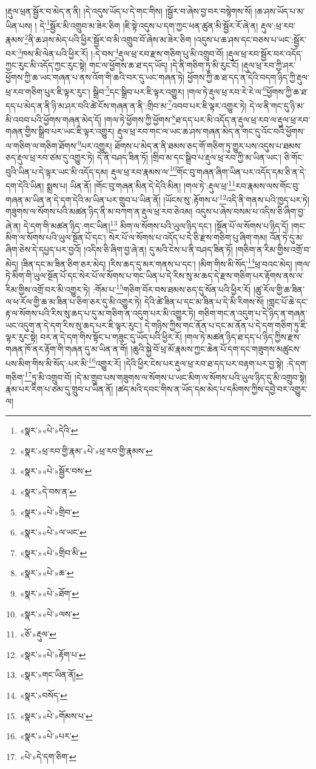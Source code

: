 །རྡུལ་ཕྲན་སྦྱོར་བ་མེད་ན་ནི། །དེ་འདུས་ཡོད་པ་དེ་གང་གིས། །སྦྱོར་བ་ཞེས་བྱ་བར་བསྙེགས་སོ། །ཆ་ཤས་ཡོད་པ་མ་ཡིན་པས། །
དེ་\footnote{«སྣར་»«པེ་»དེའི་}སྦྱོར་མི་འགྲུབ་མ་ཟེར་ཅིག །ཇི་སྟེ་འདུས་པ་དག་ཀྱང་ཕན་ཚུན་མི་སྦྱོར་རོ་ཞེ་ན། རྡུལ་:ཕྲ་རབ་རྣམས་\footnote{«སྣར་»ཕྲ་རབ་གྱི་རྣམ་«པེ་»ཕྲ་རབ་གྱི་རྣམས་}ནི་ཆ་ཤས་མེད་པའི་ཕྱིར་སྦྱོར་བ་མི་འགྲུབ་བོ་ཞེས་མ་ཟེར་ཅིག །འདུས་པ་ཆ་ཤས་དང་བཅས་པ་ཡང་:སྦྱོར་བར་\footnote{«སྣར་»«པེ་»སྦྱོར་བས་}ཁས་མི་ལེན་པའི་ཕྱིར་རོ། །:དེ་བས་\footnote{«སྣར་»དེ་བས་ན་}རྡུལ་ཕྲ་རབ་རྫས་གཅིག་པུ་མི་འགྲུབ་བོ། །རྡུལ་ཕྲ་རབ་སྦྱོར་བར་འདོད་ཀྱང་རུང་མི་འདོད་ཀྱང་རུང་སྟེ། གང་ལ་ཕྱོགས་ཆ་ཐ་དད་ཡོད། །དེ་ནི་གཅིག་ཏུ་མི་རུང་ངོ། །རྡུལ་ཕྲ་རབ་ཀྱི་ཤར་ཕྱོགས་ཀྱི་ཆ་ཡང་གཞན་པ་ནས་འོག་གི་ཆའི་བར་དུ་ཡང་གཞན་ཏེ། ཕྱོགས་ཀྱི་ཆ་ཐ་དད་ན་དེའི་བདག་ཉིད་ཀྱི་རྡུལ་ཕྲ་རབ་གཅིག་པུར་ཇི་ལྟར་རུང་། སྒྲིབ་\footnote{«སྣར་»«པེ་»གྲིབ་}དང་སྒྲིབ་པར་ཇི་ལྟར་འགྱུར། །གལ་ཏེ་རྡུལ་ཕྲ་རབ་རེ་རེ་ལ་\footnote{«སྣར་»«པེ་»ལ་ཡང་}ཕྱོགས་ཀྱི་ཆ་ཐ་དད་པ་མེད་ན་ནི་ཉི་མ་ཤར་བའི་ཚེ་ངོས་གཞན་ན་ནི་:གྲིབ་མ་\footnote{«སྣར་»«པེ་»གྲིབ་མི་}འབབ་པར་ཇི་ལྟར་འགྱུར་ཏེ། དེ་ལ་ནི་གང་དུ་ཉི་མ་མི་འབབ་པའི་ཕྱོགས་གཞན་མེད་དོ། །གལ་ཏེ་ཕྱོགས་ཀྱི་ཕྱོགས་\footnote{«སྣར་»«པེ་»ཆ་}ཐ་དད་པར་མི་འདོད་ན་རྡུལ་ཕྲ་རབ་ལ་རྡུལ་ཕྲ་རབ་གཞན་གྱིས་སྒྲིབ་པར་ཡང་ཇི་ལྟར་འགྱུར། རྡུལ་ཕྲ་རབ་གང་ལ་ཡང་ཆ་ཤས་གཞན་མེད་ན་གང་དུ་འོང་བའི་ཕྱོགས་ལ་གཅིག་ལ་གཅིག་ཐོགས་\footnote{«སྣར་»«པེ་»ཐོག་}པར་འགྱུར། ཐོགས་པ་མེད་ན་ནི་ཐམས་ཅད་གོ་གཅིག་ཏུ་གྱུར་པས་འདུས་པ་ཐམས་ཅད་རྡུལ་ཕྲ་རབ་ཙམ་དུ་འགྱུར་ཏེ། དེ་ནི་བཤད་ཟིན་ཏོ། །གྲིབ་མ་དང་སྒྲིབ་པ་རྡུལ་ཕྲ་རབ་ཀྱི་མ་ཡིན་ཡང་། ཅི་གོང་བུའི་ཡིན་པ་དེ་ལྟར་ཡང་མི་འདོད་དམ། རྡུལ་ཕྲ་རབ་རྣམས་ལ་\footnote{«སྣར་»«པེ་»ལས་}གོང་བུ་གཞན་ཞིག་ཡིན་པར་འདོད་དམ་ཅི་ན་དེ་དག་དེའི་ཡིན། སྨྲས་པ། ཡིན་ནོ། །གོང་བུ་གཞན་མིན་དེ་དེའི་མིན། །གལ་ཏེ་:རྡུལ་ཕྲ་\footnote{«ཅོ་»རྡུལ་}རབ་རྣམས་ལས་གོང་བུ་གཞན་མ་ཡིན་ན་དེ་དག་དེའི་མ་ཡིན་པར་གྲུབ་པ་ཡིན་ནོ། །ཡོངས་སུ་:རྟོགས་པ་\footnote{«སྣར་»«པེ་»རྟོག་པ་}འདི་ནི་གནས་པའི་ཁྱད་པར་ཏེ། གཟུགས་ལ་སོགས་པའི་མཚན་ཉིད་ནི་མ་བཀག་ན་རྡུལ་ཕྲ་རབ་ཅེའམ། འདུས་པ་ཞེས་བསམ་པ་འདིས་ཅི་ཞིག་བྱ་ཞེ་ན། དེ་དག་གི་མཚན་ཉིད་:གང་ཡིན།\footnote{«སྣར་»གང་ཡིན་ནོ།} མིག་ལ་སོགས་པའི་ཡུལ་ཉིད་དང་། །སྔོན་པོ་ལ་སོགས་པ་ཉིད་དོ། །གང་མིག་ལ་སོགས་པའི་ཡུལ་སྔོན་པོ་དང་། སེར་པོ་ལ་སོགས་པ་འདོད་པ་དེ་ཅི་རྫས་གཅིག་པུ་ཞིག་གམ། འོན་ཏེ་དུ་མ་ཞིག་ཅེས་དེ་དཔྱད་པར་བྱའོ། །འདིས་ཅི་ཞིག་བྱ་ཞེ་ན། དུ་མའི་ངེས་པ་ནི་བཤད་ཟིན་ཏོ། །གཅིག་ན་རིམ་གྱིས་འགྲོ་བ་མེད། །ཟིན་དང་མ་ཟིན་ཅིག་ཅར་མེད། །རིས་ཆད་དུ་མར་གནས་པ་དང་། །མིག་གིས་མི་སོད་\footnote{«སྣར་»བསོད་}ཕྲ་བའང་མེད། །གལ་ཏེ་མིག་གི་ཡུལ་སྔོན་པོ་དང་སེར་པོ་ལ་སོགས་པ་གང་ཡིན་པ་དེ་རིས་སུ་མ་ཆད་དེ་རྫས་གཅིག་པར་རྟོགས་ནས་ལ་རིམ་གྱིས་འགྲོ་བར་མི་འགྱུར་ཏེ། :གོམ་པ་\footnote{«སྣར་»«པེ་»གོམས་པ་}གཅིག་བོར་བས་ཐམས་ཅད་དུ་སོན་པའི་ཕྱིར་རོ། །ཚུ་རོལ་གྱི་ཆ་ཟིན་ལ་ཕ་རོལ་གྱི་ཆ་མ་ཟིན་པ་ཅིག་ཅར་དུ་མི་འགྱུར་ཏེ། དེའི་ཚེ་ཟིན་པ་དང་མ་ཟིན་པ་དེ་མི་རིགས་སོ། །གླང་པོ་ཆེ་དང་རྟ་ལ་སོགས་པའི་རིས་སུ་ཆད་པ་དུ་མ་གཅིག་ན་འདུག་པར་མི་འགྱུར་ཏེ། གཅིག་གང་ན་འདུག་པ་དེ་ཉིད་ན་གཞན་ཡང་འདུག་ན་དེ་དག་རིས་སུ་ཆད་པར་ཇི་ལྟར་རུང་། དེ་གཉིས་ཀྱིས་གང་ནོན་པ་དང་མ་ནོན་པ་དེ་དག་གཅིག་ཏུ་ཇི་ལྟར་རུང་སྟེ། བར་ན་དེ་དག་གིས་སྟོང་པ་གཟུང་དུ་ཡོད་པའི་ཕྱིར་རོ། །གལ་ཏེ་མཚན་ཉིད་ཐ་དད་པ་ཉིད་ཀྱིས་རྫས་གཞན་ཁོ་ནར་རྟོག་གི་གཞན་དུ་མ་ཡིན་ན་གོ། །ཆུའི་སྐྱེ་བོ་ཕྲ་མོ་རྣམས་ཀྱང་ཆེན་པོ་དག་དང་གཟུགས་མཚུངས་པས་མིག་གིས་མི་སོད་:པར་མི་\footnote{«སྣར་»«པེ་»པར་}འགྱུར་རོ། །དེའི་ཕྱིར་ངེས་པར་རྡུལ་ཕྲ་རབ་ཐ་དད་པར་བརྟག་པར་བྱ་སྟེ། :དེ་དག་གཅིག་\footnote{«པེ་»དེ་དག་ཅིག་}ཏུ་མི་འགྲུབ་བོ། །དེ་མ་གྲུབ་པས་གཟུགས་ལ་སོགས་པ་ཡང་མིག་ལ་སོགས་པའི་ཡུལ་ཉིད་དུ་མི་འགྲུབ་སྟེ། རྣམ་པར་རིག་པ་ཙམ་དུ་གྲུབ་པ་ཡིན་ནོ། །ཚད་མའི་དབང་གིས་ན་ཡོད་དམ་མེད་པ་དམིགས་ཀྱིས་དབྱེ་བར་འགྱུར་ལ། 